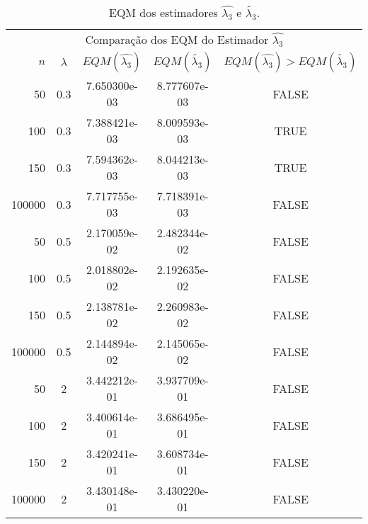 \documentclass[12pt]{article}
\begin{document}
\begin{table}[H]
\caption{EQM dos estimadores $\hat{\lambda_{3}}$ e $\tilde{\lambda_{3}}$.}
\label{tab:p1EQM}
\centering
\begin{tabular}{rcccc}
\toprule
\multicolumn{5}{c}{Comparação dos EQM do Estimador $\hat{\lambda_{3}}$}\\
$n$ & $\lambda$ & $EQM(\hat{\lambda_{3}})$ & $EQM(\tilde{\lambda_{3}})$ & $EQM(\hat{\lambda_{3}})>EQM(\tilde{\lambda_{3}})$ \\
\midrule
50 & 0.3 & 7.650300e-03 & 8.777607e-03  & FALSE \\
100 & 0.3 & 7.388421e-03 & 8.009593e-03 & TRUE \\
150 & 0.3 & 7.594362e-03 & 8.044213e-03 & TRUE \\
100000 & 0.3 & 7.717755e-03 & 7.718391e-03 & FALSE \\
\midrule
50 & 0.5 & 2.170059e-02 & 2.482344e-02  & FALSE \\
100 & 0.5 &  2.018802e-02 & 2.192635e-02 & FALSE \\
150 & 0.5 &  2.138781e-02  & 2.260983e-02 & FALSE\\
100000 & 0.5 & 2.144894e-02 & 2.145065e-02 & FALSE \\
\midrule
50 & 2 & 3.442212e-01 &  3.937709e-01 & FALSE \\
100 & 2 & 3.400614e-01 &  3.686495e-01 & FALSE \\
150 & 2 & 3.420241e-01 & 3.608734e-01 & FALSE \\
100000 & 2 & 3.430148e-01 & 3.430220e-01 & FALSE \\
\bottomrule
\end{tabular}
\end{table}


\end{document}
